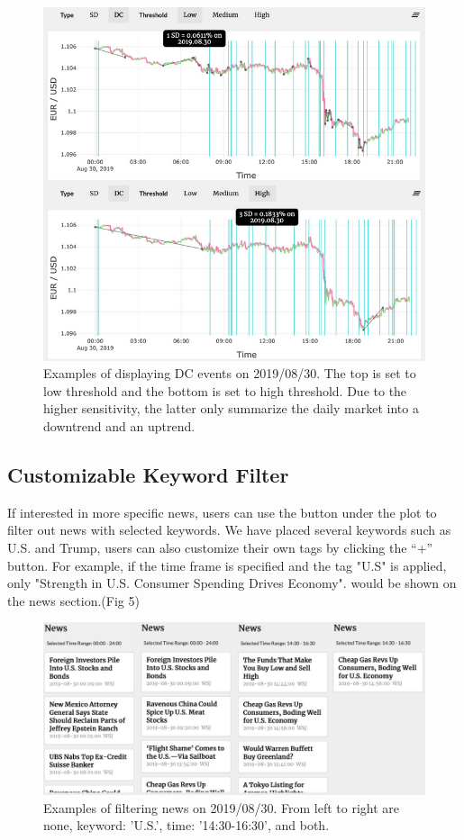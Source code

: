 \documentclass[sigconf]{acmart}
\begin{document}
\begin{figure}[h]
  \centering
  \includegraphics[width=\linewidth]{dc.png}
  \caption{Examples of displaying DC events on 2019/08/30. The top is set to low threshold and the bottom is set to high threshold. Due to the higher sensitivity, the latter only summarize the daily market into a downtrend and an uptrend.}
  \Description{}
\end{figure}

\subsection{Customizable Keyword Filter
}
If interested in more specific news, users can use the button under the plot to filter out news with selected keywords. We have placed several keywords such as U.S. and Trump, users can also customize their own tags by clicking the “+” button. For example, if the time frame is specified and the tag "U.S" is applied, only "Strength in U.S. Consumer Spending Drives Economy". would be shown on the news section.(Fig 5)


\begin{figure}[h]
  \centering
  \includegraphics[width=\linewidth]{news.png}
  \caption{Examples of filtering news on 2019/08/30. From left to right are none, keyword: 'U.S.', time: '14:30-16:30', and both.}
  \Description{}
\end{figure}
\end{document}
